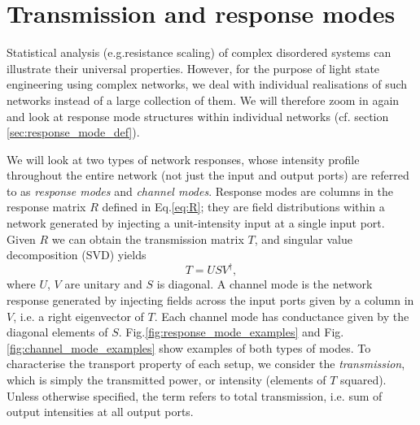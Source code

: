 \section{Transmission and response modes}
Statistical analysis (e.g.resistance scaling) of complex disordered systems can illustrate their universal properties. However, for the purpose of light state engineering using complex networks, we deal with individual realisations of such networks instead of a large collection of them. We will therefore zoom in again and look at response mode structures within individual networks (cf. section \ref{sec:response_mode_def}).

We will look at two types of network responses, whose intensity profile throughout the entire network (not just the input and output ports) are referred to as \textit{response modes} and \textit{channel modes}. Response modes are columns in the response matrix $R$ defined in Eq.\ref{eq:R}; they are field distributions within a network generated by injecting a unit-intensity input at a single input port. Given $R$ we can obtain the transmission matrix $T$, and singular value decomposition (SVD) yields
\begin{equation}
    \label{eq:T_SVD}
    T = USV^\dagger,
\end{equation}
where $U$, $V$ are unitary and $S$ is diagonal. A channel mode is the network response generated by injecting fields across the input ports given by a column in $V$, i.e. a right eigenvector of $T$. Each channel mode has conductance given by the diagonal elements of $S$. Fig.\ref{fig:response_mode_examples} and Fig.\ref{fig:channel_mode_examples} show examples of both types of modes. To characterise the transport property of each setup, we consider the \textit{transmission}, which is simply the transmitted power, or intensity (elements of $T$ squared). Unless otherwise specified, the term refers to total transmission, i.e. sum of output intensities at all output ports.

